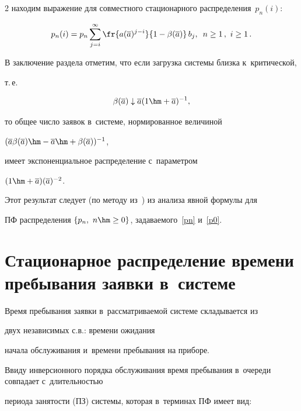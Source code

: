 \begin{multicols}{2}
находим выражение для совместного стационарного распределения~$p_n(i)$:

$$

p_n(i)=p_n \sum\limits_{j=i}^{\infty} 

\fr{a(\overline{a})^{j-i} }{1-\beta(\overline{a})}\,b_j , \enskip  n\geq 1\,, \ 

 i \geq 1\,.

$$



В заключение раздела отметим, что если загрузка системы близка к~критической,

т.\,е.\ 

$$

\beta(\overline{a}) \downarrow \overline{a} (1\hm+\overline{a})^{-1},

$$

то общее число заявок в~системе, нормированное величиной 

$(\overline{a} \beta(\overline{a}) \hm- \overline{a} \hm+ \beta(\overline{a}))^{-1}$,

имеет экспоненциальное распределение с~параметром 

$(1\hm+\overline{a})(\overline{a})^{-2}$.

Этот результат следует (по методу из~\cite{opech}) из анализа явной формулы для 

ПФ распределения $\{ p_n, \ n \hm\ge 0 \}$, задаваемого~\eqref{pn} и~\eqref{p0}.





\section{Стационарное распределение времени пребывания заявки в~системе}



Время пребывания заявки в~рассматриваемой системе складывается из

двух независимых с.в.: времени ожидания

начала обслуживания и~времени пребывания на приборе.

Ввиду инверсионного порядка обслуживания время пребывания в~очереди совпадает с~длительностью

периода занятости (ПЗ) системы, которая в~терминах ПФ имеет вид:



\vspace*{4pt}




\end{multicols}
